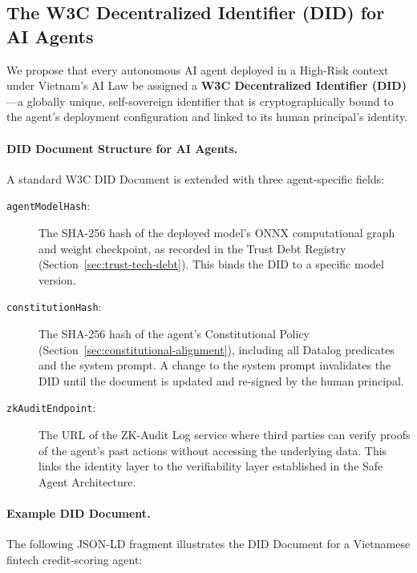 \subsection{The W3C Decentralized Identifier (DID) for AI Agents}
\label{subsec:did-architecture}

We propose that every autonomous AI agent deployed in a
High-Risk context under Vietnam's AI Law be assigned a
\textbf{W3C Decentralized Identifier (DID)}---a globally
unique, self-sovereign identifier that is cryptographically
bound to the agent's deployment configuration and linked to
its human principal's identity.

\paragraph{DID Document Structure for AI Agents.}
A standard W3C DID Document is extended with three
agent-specific fields:

\begin{description}
  \item[\texttt{agentModelHash}:]
    The SHA-256 hash of the deployed model's ONNX computational
    graph and weight checkpoint, as recorded in the Trust Debt
    Registry (Section~\ref{sec:trust-tech-debt}).
    This binds the DID to a specific model version.

  \item[\texttt{constitutionHash}:]
    The SHA-256 hash of the agent's Constitutional Policy
    (Section~\ref{sec:constitutional-alignment}), including
    all Datalog predicates and the system prompt.
    A change to the system prompt invalidates the DID until the
    document is updated and re-signed by the human principal.

  \item[\texttt{zkAuditEndpoint}:]
    The URL of the ZK-Audit Log service where third parties
    can verify proofs of the agent's past actions without
    accessing the underlying data.
    This links the identity layer to the verifiability
    layer established in the Safe Agent Architecture.
\end{description}

\paragraph{Example DID Document.}
The following JSON-LD fragment illustrates the DID Document
for a Vietnamese fintech credit-scoring agent:

